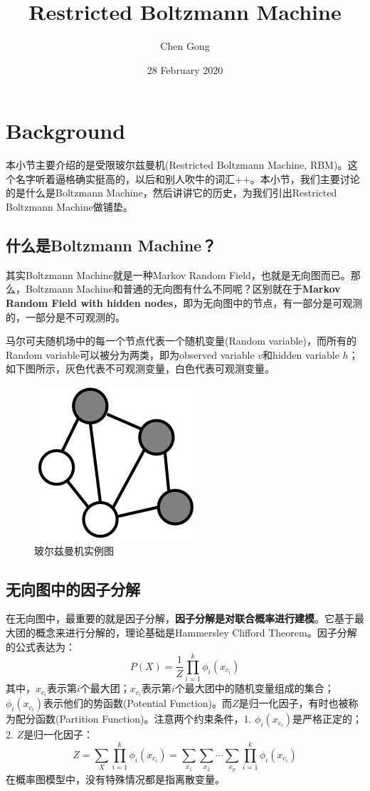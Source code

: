 \documentclass[a4paper]{article}
\title{Restricted Boltzmann Machine}
\author{Chen Gong}
\date{28 February 2020}
\begin{document}
\maketitle
\tableofcontents
\newpage
\setcounter{page}{1} %
\clearpage

\section{Background}
本小节主要介绍的是受限玻尔兹曼机(Restricted Boltzmann Machine, RBM)。这个名字听着逼格确实挺高的，以后和别人吹牛的词汇++。本小节，我们主要讨论的是什么是Boltzmann Machine，然后讲讲它的历史，为我们引出Restricted Boltzmann Machine做铺垫。
\subsection{什么是Boltzmann Machine？}
其实Boltzmann Machine就是一种Markov Random Field，也就是无向图而已。那么，Boltzmann Machine和普通的无向图有什么不同呢？区别就在于\textbf{Markov Random Field with hidden nodes}，即为无向图中的节点，有一部分是可观测的，一部分是不可观测的。

马尔可夫随机场中的每一个节点代表一个随机变量(Random variable)，而所有的Random variable可以被分为两类，即为observed variable $v$和hidden variable $h$；如下图所示，灰色代表不可观测变量，白色代表可观测变量。
\begin{figure}[H]
    \centering
    \includegraphics[width=.25\textwidth]{微信图片_20200228220817.png}
    \caption{玻尔兹曼机实例图}
    \label{fig:my_label_1}
\end{figure}

\subsection{无向图中的因子分解}
在无向图中，最重要的就是因子分解，\textbf{因子分解是对联合概率进行建模}。它基于最大团的概念来进行分解的，理论基础是Hammersley Clifford Theorem。因子分解的公式表达为：
\begin{equation}
    P(X) = \frac{1}{Z} \prod_{i=1}^k \phi_i (x_{c_i})
\end{equation}
其中，$x_{c_i}$表示第$i$个最大团；$x_{c_i}$表示第$i$个最大团中的随机变量组成的集合；$\phi_i (x_{c_i})$表示他们的势函数(Potential Function)。而$Z$是归一化因子，有时也被称为配分函数(Partition Function)。注意两个约束条件，1. $\phi_i (x_{c_i})$是严格正定的；2. $Z$是归一化因子：
$$
Z = \sum_X \prod_{i=1}^k \phi_i (x_{c_i}) = \sum_{x_1}\sum_{x_2}\cdots \sum_{x_p} \prod_{i=1}^k \phi_i (x_{c_i})
$$
在概率图模型中，没有特殊情况都是指离散变量。
\end{document}

